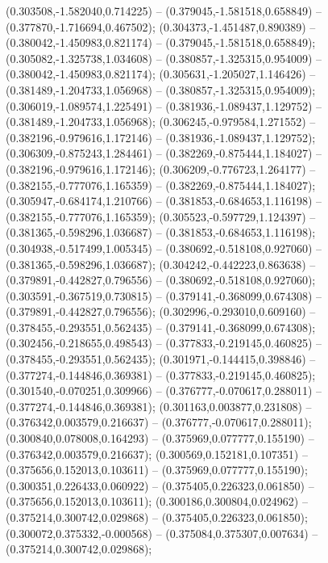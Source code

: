  (0.303508,-1.582040,0.714225) -- (0.379045,-1.581518,0.658849) -- (0.377870,-1.716694,0.467502);
 (0.304373,-1.451487,0.890389) -- (0.380042,-1.450983,0.821174) -- (0.379045,-1.581518,0.658849);
 (0.305082,-1.325738,1.034608) -- (0.380857,-1.325315,0.954009) -- (0.380042,-1.450983,0.821174);
 (0.305631,-1.205027,1.146426) -- (0.381489,-1.204733,1.056968) -- (0.380857,-1.325315,0.954009);
 (0.306019,-1.089574,1.225491) -- (0.381936,-1.089437,1.129752) -- (0.381489,-1.204733,1.056968);
 (0.306245,-0.979584,1.271552) -- (0.382196,-0.979616,1.172146) -- (0.381936,-1.089437,1.129752);
 (0.306309,-0.875243,1.284461) -- (0.382269,-0.875444,1.184027) -- (0.382196,-0.979616,1.172146);
 (0.306209,-0.776723,1.264177) -- (0.382155,-0.777076,1.165359) -- (0.382269,-0.875444,1.184027);
 (0.305947,-0.684174,1.210766) -- (0.381853,-0.684653,1.116198) -- (0.382155,-0.777076,1.165359);
 (0.305523,-0.597729,1.124397) -- (0.381365,-0.598296,1.036687) -- (0.381853,-0.684653,1.116198);
 (0.304938,-0.517499,1.005345) -- (0.380692,-0.518108,0.927060) -- (0.381365,-0.598296,1.036687);
 (0.304242,-0.442223,0.863638) -- (0.379891,-0.442827,0.796556) -- (0.380692,-0.518108,0.927060);
 (0.303591,-0.367519,0.730815) -- (0.379141,-0.368099,0.674308) -- (0.379891,-0.442827,0.796556);
 (0.302996,-0.293010,0.609160) -- (0.378455,-0.293551,0.562435) -- (0.379141,-0.368099,0.674308);
 (0.302456,-0.218655,0.498543) -- (0.377833,-0.219145,0.460825) -- (0.378455,-0.293551,0.562435);
 (0.301971,-0.144415,0.398846) -- (0.377274,-0.144846,0.369381) -- (0.377833,-0.219145,0.460825);
 (0.301540,-0.070251,0.309966) -- (0.376777,-0.070617,0.288011) -- (0.377274,-0.144846,0.369381);
 (0.301163,0.003877,0.231808) -- (0.376342,0.003579,0.216637) -- (0.376777,-0.070617,0.288011);
 (0.300840,0.078008,0.164293) -- (0.375969,0.077777,0.155190) -- (0.376342,0.003579,0.216637);
 (0.300569,0.152181,0.107351) -- (0.375656,0.152013,0.103611) -- (0.375969,0.077777,0.155190);
 (0.300351,0.226433,0.060922) -- (0.375405,0.226323,0.061850) -- (0.375656,0.152013,0.103611);
 (0.300186,0.300804,0.024962) -- (0.375214,0.300742,0.029868) -- (0.375405,0.226323,0.061850);
 (0.300072,0.375332,-0.000568) -- (0.375084,0.375307,0.007634) -- (0.375214,0.300742,0.029868);
